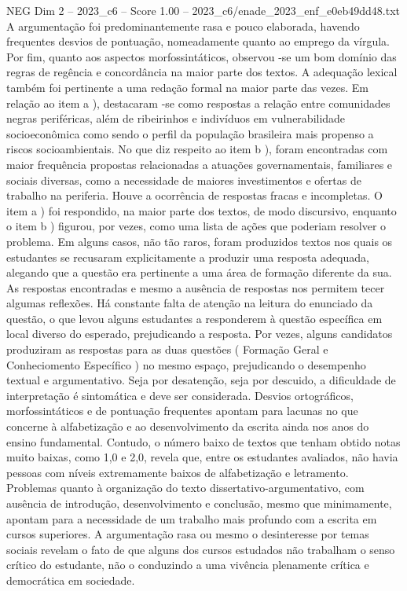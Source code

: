 \begin{textsample}{NEG Dim 2 – 2023\_c6 – Score 1.00 – 2023\_c6/enade\_2023\_enf\_e0eb49dd48.txt}
A argumentação foi predominantemente rasa e pouco elaborada, havendo frequentes desvios de pontuação, nomeadamente quanto ao emprego da vírgula.
Por fim, quanto aos aspectos morfossintáticos, observou -se um bom domínio das regras de regência e concordância na maior parte dos textos.
A adequação lexical também foi pertinente a uma redação formal na maior parte das vezes.
Em relação ao item a ), destacaram -se como respostas a relação entre comunidades negras periféricas, além de ribeirinhos e indivíduos em vulnerabilidade socioeconômica como sendo o perfil da população brasileira mais propenso a riscos socioambientais.
No que diz respeito ao item b ), foram encontradas com maior frequência propostas relacionadas a atuações governamentais, familiares e sociais diversas, como a necessidade de maiores investimentos e ofertas de trabalho na periferia.
Houve a ocorrência de respostas fracas e incompletas.
O item a ) foi respondido, na maior parte dos textos, de modo discursivo, enquanto o item b ) figurou, por vezes, como uma lista de ações que poderiam resolver o problema.
Em alguns casos, não tão raros, foram produzidos textos nos quais os estudantes se recusaram explicitamente a produzir uma resposta adequada, alegando que a questão era pertinente a uma área de formação diferente da sua.
As respostas encontradas e mesmo a ausência de respostas nos permitem tecer algumas reflexões.
Há constante falta de atenção na leitura do enunciado da questão, o que levou alguns estudantes a responderem à questão específica em local diverso do esperado, prejudicando a resposta.
Por vezes, alguns candidatos produziram as respostas para as duas questões ( Formação Geral e Conheciomento Específico ) no mesmo espaço, prejudicando o desempenho textual e argumentativo.
Seja por desatenção, seja por descuido, a dificuldade de interpretação é sintomática e deve ser considerada.
Desvios ortográficos, morfossintáticos e de pontuação frequentes apontam para lacunas no que concerne à alfabetização e ao desenvolvimento da escrita ainda nos anos do ensino fundamental.
Contudo, o número baixo de textos que tenham obtido notas muito baixas, como 1,0 e 2,0, revela que, entre os estudantes avaliados, não havia pessoas com níveis extremamente baixos de alfabetização e letramento.
Problemas quanto à organização do texto dissertativo-argumentativo, com ausência de introdução, desenvolvimento e conclusão, mesmo que minimamente, apontam para a necessidade de um trabalho mais profundo com a escrita em cursos superiores.
A argumentação rasa ou mesmo o desinteresse por temas sociais revelam o fato de que alguns dos cursos estudados não trabalham o senso crítico do estudante, não o conduzindo a uma vivência plenamente crítica e democrática em sociedade.

\end{textsample}
